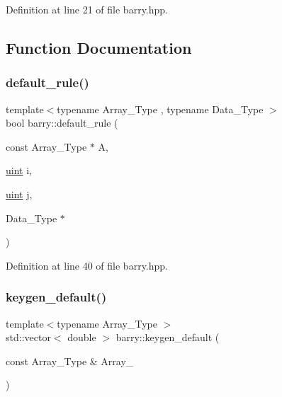 Definition at line 21 of file barry.\+hpp.



\subsection{Function Documentation}
\mbox{\label{namespacebarry_a1cb28b501bc7f88c0b3d68d51ad672e1}} 
\subsubsection{\texorpdfstring{default\+\_\+rule()}{default\_rule()}}
{\footnotesize\ttfamily template$<$typename Array\+\_\+\+Type , typename Data\+\_\+\+Type $>$ \\
bool barry\+::default\+\_\+rule (\begin{DoxyParamCaption}\item[{const Array\+\_\+\+Type $\ast$}]{A,  }\item[{\hyperlink{namespacebarry_a11dfc53ddb4672278319aa04f1e09a6c}{uint}}]{i,  }\item[{\hyperlink{namespacebarry_a11dfc53ddb4672278319aa04f1e09a6c}{uint}}]{j,  }\item[{Data\+\_\+\+Type $\ast$}]{ }\end{DoxyParamCaption})\hspace{0.3cm}{\ttfamily [inline]}}



Definition at line 40 of file barry.\+hpp.

\mbox{\label{namespacebarry_a22bfc7c4a1f5b5922edfd1101b8ffe3d}} 
\subsubsection{\texorpdfstring{keygen\+\_\+default()}{keygen\_default()}}
{\footnotesize\ttfamily template$<$typename Array\+\_\+\+Type $>$ \\
std\+::vector$<$ double $>$ barry\+::keygen\+\_\+default (\begin{DoxyParamCaption}\item[{const Array\+\_\+\+Type \&}]{Array\+\_\+ }\end{DoxyParamCaption})\hspace{0.3cm}{\ttfamily [inline]}}



